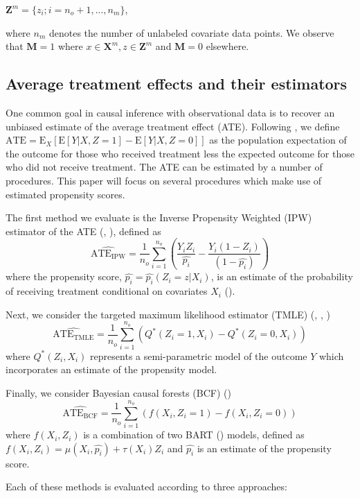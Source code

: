 \documentclass[aos]{imsart}
\newcommand{\X}{\mathbf{X}}
\newcommand{\M}{\mathbf{M}}
\newcommand{\Z}{\mathbf{Z}}
\newcommand{\E}{\mbox{E}}
\begin{document}
$\Z^m = \{z_i; i = n_o + 1, ... ,n_m \}$, 

where $n_m$ denotes the number of unlabeled covariate data points. We observe that $\M = 1$ where $x \in \X^m, z \in \Z^m$ and $\M = 0$ elsewhere.

\subsection{Average treatment effects and their estimators}

One common goal in causal inference with observational data is to recover an unbiased estimate of the average treatment effect (ATE). Following \cite{rosenbaum1983central}, 
we define $\textrm{ATE} = \E_X[\E[Y | X, Z = 1] - \E[Y | X, Z = 0]]$ as the population expectation of the outcome for those who received treatment less the expected outcome for those who did 
not receive treatment. The ATE can be estimated by a number of procedures. This paper will focus on several procedures which make use of estimated propensity scores.

The first method we evaluate is the Inverse Propensity Weighted (IPW) estimator of the ATE (\cite{hirano2003efficient}, \cite{cerulli2014treatrew}), defined as
\[ \widehat{\textrm{ATE}_{\textrm{IPW}}} = \frac{1}{n_o} \sum_{i = 1}^{n_o} \left( \frac{Y_i Z_i}{\hat{p_i}} - \frac{Y_i (1 - Z_i)}{(1 - \hat{p_i})} \right) \]
where the propensity score, $\hat{p_i} = \hat{p_i}(Z_i = z | X_i)$, is an estimate of the probability of receiving treatment conditional on covariates $X_i$ (\cite{rosenbaum1983central}).

Next, we consider the targeted maximum likelihood estimator (TMLE) (\cite{van2010targeted}, \cite{van2010targeted2}, \cite{gruber2009targeted})
\[\widehat{\textrm{ATE}_{\textrm{TMLE}}} = \frac{1}{n_o} \sum_{i = 1}^{n_o} \left( Q^*\left( Z_i = 1, X_i \right) - Q^*\left( Z_i = 0, X_i \right) \right)\]
where $Q^*\left( Z_i, X_i \right)$ represents a semi-parametric model of the outcome $Y$ which incorporates an estimate of the propensity model.

Finally, we consider Bayesian causal forests (BCF) (\cite{hahn2017bayesian})
\[\widehat{\textrm{ATE}_{\textrm{BCF}}} = \frac{1}{n_o} \sum_{i = 1}^{n_o} \left( f(X_i, Z_i = 1) - f(X_i, Z_i = 0) \right) \]
where $f(X_i, Z_i)$ is a combination of two BART (\cite{chipman2010bart}) models, defined as $f(X_i, Z_i) = \mu(X_i, \hat{p_i}) + \tau(X_i) Z_i$ and $\hat{p_i}$ is an estimate of the propensity score.

Each of these methods is evaluated according to three approaches:
\end{document}
